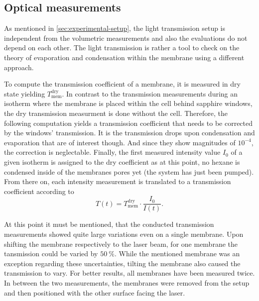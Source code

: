 \documentclass[../thesis.tex]{subfiles}
\begin{document}
    \subsection{Optical measurements}
    \label{subsec:optical-computation}

      As mentioned in \cref{sec:experimental-setup}, the light transmission setup is independent from the volumetric measurements and also the evaluations do not depend on each other. The light transmission is rather a tool to check on the theory of evaporation and condensation within the membrane using a different approach.
      \medskip

      To compute the transmission coefficient of a membrane, it is measured in dry state yielding $T_\mathrm{mem}^\mathrm{dry}$. In contrast to the transmission measurements during an isotherm where the membrane is placed within the cell behind sapphire windows, the dry transmission measurment is done without the cell. Therefore, the following computation yields a transmission coefficient that needs to be corrected by the windows' transmission. It is the transmission drops upon condensation and evaporation that are of interest though. And since they show magnitudes of $10^{-4}$, the correction is neglectable.
      Finally, the first measured intensity value $I_0$ of a given isotherm is assigned to the dry coefficient as at this point, no hexane is condensed inside of the membranes pores yet (the system has just been pumped). From there on, each intensity measurement is translated to a transmission coefficient according to
      \begin{equation}
          T(t) = T_\mathrm{mem}^\mathrm{dry} \cdot \frac{I_0}{I(t)}.
      \end{equation}

      At this point it must be mentioned, that the conducted transmission measurements showed quite large variations even on a single membrane. Upon shifting the membrane respectively to the laser beam, for one membrane the tansmission could be varied by $\SI{50}{\percent}$. While the mentioned membrane was an exception regarding these uncertainties, tilting the membrane also caused the transmission to vary. For better results, all membranes have been measured twice. In between the two measurements, the membranes were removed from the setup and then positioned with the other surface facing the  laser.
\end{document}
